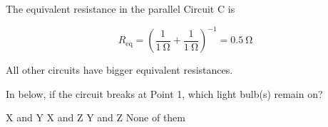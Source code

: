 \documentclass[]{exam}
\begin{document}
\begin{questions}

\begin{solution}
The equivalent resistance in the parallel Circuit C is

\begin{equation*}
    R_\mathrm{eq} = \left(\frac{1}{\SI{1}{\ohm}} + \frac{1}{\SI{1}{\ohm}}\right)^{-1} = \SI{0.5}{\ohm}
\end{equation*}

All other circuits have bigger equivalent resistances.
\end{solution}

\question
In below, if the circuit breaks at Point 1, which light bulb(s) remain on?

\begin{center}

\end{center}

\begin{randomizechoices}
    \choice X and Y
    \correctchoice X and Z
    \choice Y and Z
    \choice None of them
\end{randomizechoices}









\end{questions}
\end{document}
